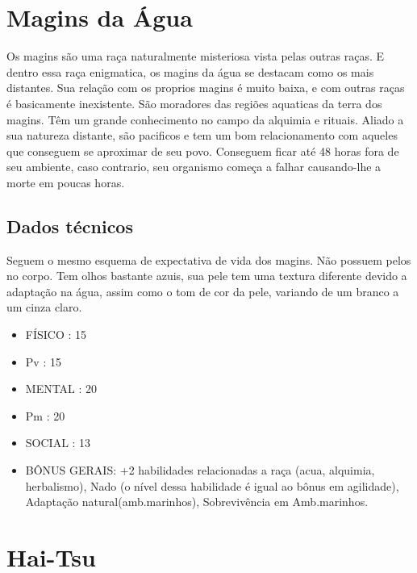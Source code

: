 \section{Magins da Água}

Os magins são uma raça naturalmente misteriosa vista pelas outras raças. E dentro essa raça enigmatica, os magins da água se destacam como os mais distantes. Sua relação com os proprios magins é muito baixa, e com outras raças é basicamente inexistente. São moradores das regiões aquaticas da terra dos magins. Têm um grande conhecimento no campo da alquimia e rituais. Aliado a sua natureza distante, são pacificos e tem um bom relacionamento com aqueles que conseguem se aproximar de seu povo. Conseguem ficar até 48 horas fora de seu ambiente, caso contrario, seu organismo começa a falhar causando-lhe a morte em poucas horas.

\subsection{Dados técnicos}


Seguem o mesmo esquema de expectativa de vida dos magins. Não possuem pelos no corpo. Tem olhos bastante azuis, sua pele tem uma textura diferente devido a adaptação na água, assim como o tom de cor da pele, variando de um branco a um cinza claro.


\begin{itemize}


\item FÍSICO : 15
\item Pv : 15

\item MENTAL : 20
\item Pm : 20

\item SOCIAL : 13

\item BÔNUS GERAIS: +2 habilidades relacionadas a raça (acua, alquimia, herbalismo), Nado (o nível dessa habilidade é igual ao bônus em agilidade), Adaptação natural(amb.marinhos), Sobrevivência em Amb.marinhos.


\end{itemize}

\section{Hai-Tsu}

